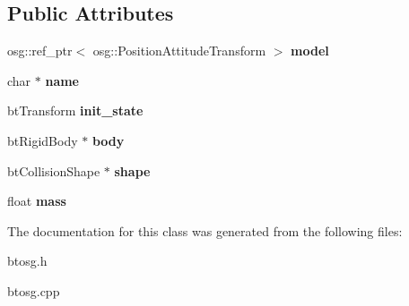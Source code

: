 \subsection*{Public Attributes}
\begin{DoxyCompactItemize}
\item 
\mbox{\label{classbtosgObject_afd15726e7a214212d6d5815f8ac1ac6c}} 
osg\+::ref\+\_\+ptr$<$ osg\+::\+Position\+Attitude\+Transform $>$ {\bfseries model}
\item 
\mbox{\label{classbtosgObject_a12396e1362797a75473a2e833b579cc9}} 
char $\ast$ {\bfseries name}
\item 
\mbox{\label{classbtosgObject_a2dee023f311114e200df9b04c8c1b400}} 
bt\+Transform {\bfseries init\+\_\+state}
\item 
\mbox{\label{classbtosgObject_a64ccde0543c184ed1749fdb9c9699785}} 
bt\+Rigid\+Body $\ast$ {\bfseries body}
\item 
\mbox{\label{classbtosgObject_a0f6a8da01cf643c321bffe86e42604b0}} 
bt\+Collision\+Shape $\ast$ {\bfseries shape}
\item 
\mbox{\label{classbtosgObject_a2418bb2194d5e9b0f1c51c84672ba7d1}} 
float {\bfseries mass}
\end{DoxyCompactItemize}


The documentation for this class was generated from the following files\+:\begin{DoxyCompactItemize}
\item 
btosg.\+h\item 
btosg.\+cpp\end{DoxyCompactItemize}
